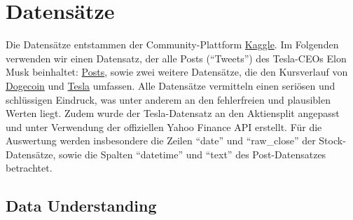 \documentclass{article}
\begin{document}
\section{Datensätze}
Die Datensätze entstammen der Community-Plattform \href{https://www.kaggle.com/datasets/dhruvildave/dogecoin-historical-data}{Kaggle}.
Im Folgenden verwenden wir einen Datensatz, der alle Posts (``Tweets'') des Tesla-CEOs Elon Musk  beinhaltet: \href{https://www.kaggle.com/datasets/aryansingh0909/elon-musk-tweets-updated-daily}{Posts}, sowie zwei weitere Datensätze, die den Kursverlauf von \href{https://www.kaggle.com/datasets/dhruvildave/dogecoin-historical-data}{Dogecoin} und \href{https://www.kaggle.com/datasets/guillemservera/tsla-stock-data}{Tesla} umfassen.
Alle Datensätze vermitteln einen seriösen und schlüssigen Eindruck, was unter anderem an den fehlerfreien und plausiblen Werten liegt.
Zudem wurde der Tesla-Datensatz an den Aktiensplit angepasst und unter Verwendung der offiziellen Yahoo Finance API erstellt.
Für die Auswertung werden insbesondere die Zeilen ``date'' und ``raw\_close'' der Stock-Datensätze, sowie die Spalten ``datetime'' und ``text'' des Post-Datensatzes betrachtet.


\subsection{Data Understanding}
\end{document}
